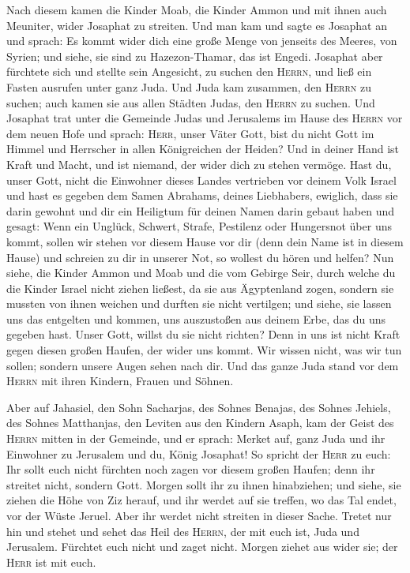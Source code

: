  Nach diesem kamen die Kinder Moab, die Kinder Ammon und
mit ihnen auch Meuniter, wider Josaphat zu streiten.  Und
man kam und sagte es Josaphat an und sprach: Es kommt wider dich eine
große Menge von jenseits des Meeres, von Syrien; und siehe, sie sind zu
Hazezon-Thamar, das ist Engedi.  Josaphat aber fürchtete
sich und stellte sein Angesicht, zu suchen den \textsc{Herrn}, und ließ
ein Fasten ausrufen unter ganz Juda.  Und Juda kam
zusammen, den \textsc{Herrn} zu suchen; auch kamen sie aus allen Städten
Judas, den \textsc{Herrn} zu suchen.  Und Josaphat trat
unter die Gemeinde Judas und Jerusalems im Hause des \textsc{Herrn} vor
dem neuen Hofe  und sprach: \textsc{Herr}, unser Väter
Gott, bist du nicht Gott im Himmel und Herrscher in allen Königreichen
der Heiden? Und in deiner Hand ist Kraft und Macht, und ist niemand, der
wider dich zu stehen vermöge.  Hast du, unser Gott, nicht
die Einwohner dieses Landes vertrieben vor deinem Volk Israel und hast
es gegeben dem Samen Abrahams, deines Liebhabers, ewiglich,
 dass sie darin gewohnt und dir ein Heiligtum für deinen
Namen darin gebaut haben und gesagt:  Wenn ein Unglück,
Schwert, Strafe, Pestilenz oder Hungersnot über uns kommt, sollen wir
stehen vor diesem Hause vor dir (denn dein Name ist in diesem Hause) und
schreien zu dir in unserer Not, so wollest du hören und helfen?
 Nun siehe, die Kinder Ammon und Moab und die vom Gebirge
Seir, durch welche du die Kinder Israel nicht ziehen ließest, da sie aus
Ägyptenland zogen, sondern sie mussten von ihnen weichen und durften sie
nicht vertilgen;  und siehe, sie lassen uns das entgelten
und kommen, uns auszustoßen aus deinem Erbe, das du uns gegeben hast.
 Unser Gott, willst du sie nicht richten? Denn in uns ist
nicht Kraft gegen diesen großen Haufen, der wider uns kommt. Wir wissen
nicht, was wir tun sollen; sondern unsere Augen sehen nach dir.
 Und das ganze Juda stand vor dem \textsc{Herrn} mit
ihren Kindern, Frauen und Söhnen.

 Aber auf Jahasiel, den Sohn Sacharjas, des Sohnes
Benajas, des Sohnes Jehiels, des Sohnes Matthanjas, den Leviten aus den
Kindern Asaph, kam der Geist des \textsc{Herrn} mitten in der Gemeinde,
 und er sprach: Merket auf, ganz Juda und ihr Einwohner
zu Jerusalem und du, König Josaphat! So spricht der \textsc{Herr} zu
euch: Ihr sollt euch nicht fürchten noch zagen vor diesem großen Haufen;
denn ihr streitet nicht, sondern Gott.  Morgen sollt ihr
zu ihnen hinabziehen; und siehe, sie ziehen die Höhe von Ziz herauf, und
ihr werdet auf sie treffen, wo das Tal endet, vor der Wüste Jeruel.
 Aber ihr werdet nicht streiten in dieser Sache. Tretet
nur hin und stehet und sehet das Heil des \textsc{Herrn}, der mit euch
ist, Juda und Jerusalem. Fürchtet euch nicht und zaget nicht. Morgen
ziehet aus wider sie; der \textsc{Herr} ist mit euch.

